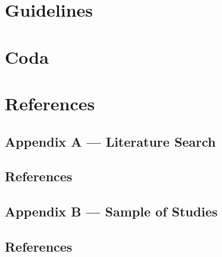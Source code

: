 \documentclass[nobib]{tufte-handout}
\begin{document}
\begin{refsection}


\section{Guidelines}



\section{Coda}



%
\section{References}
\printbibliography[heading=none]
\end{refsection}

\begin{refsection}

\section{Appendix A --- Literature Search}
\label{sec:sampling}



\subsection{References}

\printbibliography[heading=none]

\end{refsection}

\begin{refsection}

\section{Appendix B --- Sample of Studies}
\label{sec:sample_of_studies}



\subsection{References}

\printbibliography[heading=none]

\end{refsection}

\end{document}
